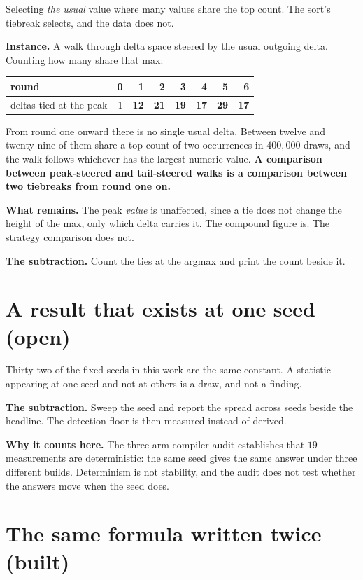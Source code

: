 Selecting \emph{the usual} value where many values share the top count. The sort's tiebreak selects, and the data does not.

\textbf{Instance.} A walk through delta space steered by the usual outgoing delta. Counting how many share that max:

\begin{center}
\begin{tabular}{@{}lrrrrrrr@{}}
\toprule
round & 0 & 1 & 2 & 3 & 4 & 5 & 6 \\
\midrule
deltas tied at the peak & 1 & \textbf{12} & \textbf{21} & \textbf{19} & \textbf{17} & \textbf{29} & \textbf{17} \\
\bottomrule
\end{tabular}
\end{center}

From round one onward there is no single usual delta. Between twelve and twenty-nine of them share a top count of two occurrences in \(400{,}000\) draws, and the walk follows whichever has the largest numeric value. \textbf{A comparison between peak-steered and tail-steered walks is a comparison between two tiebreaks from round one on.}

\textbf{What remains.} The peak \emph{value} is unaffected, since a tie does not change the height of the max, only which delta carries it. The compound figure is. The strategy comparison does not.

\textbf{The subtraction.} Count the ties at the argmax and print the count beside it.

\section{A result that exists at one seed (open)}

Thirty-two of the fixed seeds in this work are the same constant. A statistic appearing at one seed and not at others is a draw, and not a finding.

\textbf{The subtraction.} Sweep the seed and report the spread across seeds beside the headline. The detection floor is then measured instead of derived.

\textbf{Why it counts here.} The three-arm compiler audit establishes that \(19\) measurements are deterministic: the same seed gives the same answer under three different builds. Determinism is not stability, and the audit does not test whether the answers move when the seed does.

\section{The same formula written twice (built)}

